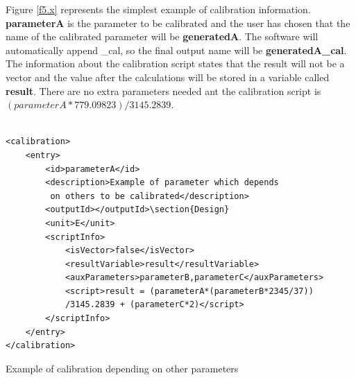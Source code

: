 Figure \ref{f5.x} represents the simplest example of calibration information. \textbf{parameterA} is the parameter to be calibrated and the user has chosen that the name of the calibrated parameter will be \textbf{generatedA}. The software will automatically append  \_cal, so the final output name will be \textbf{generatedA\_cal}. The information about the calibration script states that the result will not be a vector and the value after the calculations will be stored in a variable called \textbf{result}. There are no extra parameters needed ant the calibration script is $(parameterA*779.09823)/3145.2839$.

\begin{table}[H]
\lstset{language=XML}
\begin{lstlisting}

<calibration>
	<entry>
		<id>parameterA</id>
		<description>Example of parameter which depends
		 on others to be calibrated</description>
		<outputId></outputId>\section{Design}
		<unit>E</unit>
		<scriptInfo>
			<isVector>false</isVector>
			<resultVariable>result</resultVariable>
			<auxParameters>parameterB,parameterC</auxParameters>
			<script>result = (parameterA*(parameterB*2345/37))
			/3145.2839 + (parameterC*2)</script>
		</scriptInfo>
	</entry>
</calibration>
\end{lstlisting}
\caption{Example of calibration depending on other parameters}
\label{Table5.x}
\end{table}

